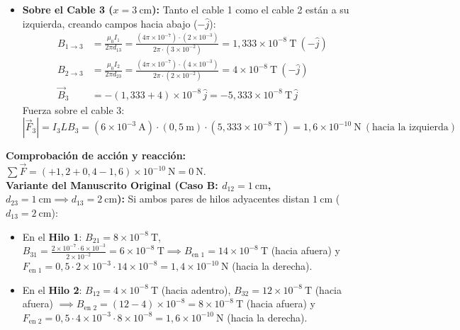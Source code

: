 \begin{ejercicio}
\begin{itemize}[leftmargin=*]
    \item \textbf{Sobre el Cable 3 ($x = 3\ \si{\centi\meter}$):} Tanto el cable 1 como el cable 2 están a su izquierda, creando campos hacia abajo ($-\hat{j}$):
    \begin{align}
        B_{1 \to 3} &= \frac{\mu_0 I_1}{2\pi d_{13}} = \frac{(4\pi \times 10^{-7}) \cdot (2 \times 10^{-3})}{2\pi \cdot (3 \times 10^{-2})} = 1{,}333 \times 10^{-8}\ \si{\tesla}\ (-\hat{j}) \\
        B_{2 \to 3} &= \frac{\mu_0 I_2}{2\pi d_{23}} = \frac{(4\pi \times 10^{-7}) \cdot (4 \times 10^{-3})}{2\pi \cdot (2 \times 10^{-2})} = 4 \times 10^{-8}\ \si{\tesla}\ (-\hat{j}) \\
        \vec{B}_3 &= -(1{,}333 + 4) \times 10^{-8}\,\hat{j} = -5{,}333 \times 10^{-8}\ \si{\tesla}\,\hat{j}
    \end{align}
    Fuerza sobre el cable 3:
    \begin{equation}
        |\vec{F}_3| = I_3 L B_3 = (6 \times 10^{-3}\ \si{\ampere}) \cdot (0{,}5\ \si{\meter}) \cdot (5{,}333 \times 10^{-8}\ \si{\tesla}) = 1{,}6 \times 10^{-10}\ \si{\newton}\ (\text{hacia la izquierda})
    \end{equation}
\end{itemize}
\textbf{Comprobación de acción y reacción:} $\sum \vec{F} = (+1{,}2 + 0{,}4 - 1{,}6) \times 10^{-10}\ \si{\newton} = 0\ \si{\newton}$.\\[6pt]
\textbf{Variante del Manuscrito Original (Caso B: $d_{12} = 1\ \si{\centi\meter}$, $d_{23} = 1\ \si{\centi\meter} \implies d_{13} = 2\ \si{\centi\meter}$):}
Si ambos pares de hilos adyacentes distan $1\ \si{\centi\meter}$ ($d_{13} = 2\ \si{\centi\meter}$):
\begin{itemize}[leftmargin=*]
    \item En el \textbf{Hilo 1}: $B_{21} = 8 \times 10^{-8}\ \si{\tesla}$, $B_{31} = \frac{2 \times 10^{-7} \cdot 6 \times 10^{-3}}{2 \times 10^{-2}} = 6 \times 10^{-8}\ \si{\tesla} \implies B_{\text{en } 1} = 14 \times 10^{-8}\ \si{\tesla}$ (hacia afuera) y $F_{\text{en } 1} = 0{,}5 \cdot 2 \times 10^{-3} \cdot 14 \times 10^{-8} = 1{,}4 \times 10^{-10}\ \si{\newton}$ (hacia la derecha).
    \item En el \textbf{Hilo 2}: $B_{12} = 4 \times 10^{-8}\ \si{\tesla}$ (hacia adentro), $B_{32} = 12 \times 10^{-8}\ \si{\tesla}$ (hacia afuera) $\implies B_{\text{en } 2} = (12 - 4) \times 10^{-8} = 8 \times 10^{-8}\ \si{\tesla}$ (hacia afuera) y $F_{\text{en } 2} = 0{,}5 \cdot 4 \times 10^{-3} \cdot 8 \times 10^{-8} = 1{,}6 \times 10^{-10}\ \si{\newton}$ (hacia la derecha).

\end{itemize}
\end{ejercicio}
